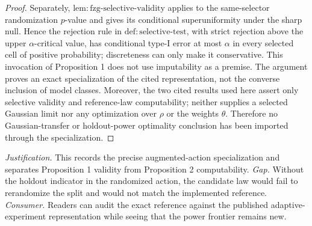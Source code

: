 \documentclass{article}
\begin{document}
\begin{proof}
Separately, \(\mathrm{lem{:}fzg\mbox{-}selective\mbox{-}validity}\) applies to the same-selector randomization \(p\)-value and gives its conditional superuniformity under the sharp null.  Hence the rejection rule in \(\mathrm{def{:}selective\mbox{-}test}\), with strict rejection above the upper \(\alpha\)-critical value, has conditional type-I error at most \(\alpha\) in every selected cell of positive probability; discreteness can only make it conservative.  This invocation of Proposition 1 does not use imputability as a premise.  The argument proves an exact specialization of the cited representation, not the converse inclusion of model classes.  Moreover, the two cited results used here assert only selective validity and reference-law computability; neither supplies a selected Gaussian limit nor any optimization over \(\rho\) or the weights \(\theta\).  Therefore no Gaussian-transfer or holdout-power optimality conclusion has been imported through the specialization.
\end{proof}
\par\smallskip\noindent \textit{Justification.} This records the precise augmented-action specialization and separates Proposition 1 validity from Proposition 2 computability. \textit{Gap.} Without the holdout indicator in the randomized action, the candidate law would fail to rerandomize the split and would not match the implemented reference. \textit{Consumer.} Readers can audit the exact reference against the published adaptive-experiment representation while seeing that the power frontier remains new.
\end{document}
